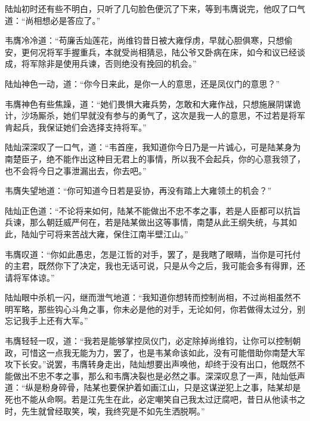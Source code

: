 陆灿初时还有些不明白，只听了几句脸色便沉了下来，等到韦膺说完，他叹了口气道：“尚相想必是答应了。”

韦膺冷冷道：“苟廉舌灿莲花，尚维钧昔日被大雍俘虏，早就心胆俱寒，只想偷安，更何况将军手握重兵，本就受尚相猜忌，陆公爷又卧病在床，如今和议已经谈成，将军除非是使用兵谏，否则绝没有挽回的机会。”

陆灿神色一动，道：“你今日来此，是你一人的意思，还是凤仪门的意思？”

韦膺神色有些焦躁，道：“她们畏惧大雍兵势，怎敢和大雍作战，只想施展阴谋诡计，沙场厮杀，她们早就没有参与的勇气了，这次是我一人的意思，不过若是将军肯起兵，我保证她们会选择支持将军。”

陆灿深深叹了一口气，道：“韦首座，我知道你今日乃是一片诚心，可是陆某身为南楚臣子，绝不能作出这种目无君上的事情，所以我不会起兵，你的心意我领了，也不会将今日之事泄漏出去，你去吧。”

韦膺失望地道：“你可知道今日若是妥协，再没有踏上大雍领土的机会？”

陆灿正色道：“不论将来如何，陆某不能做出不忠不孝之事，若是人臣都可以抗旨兵谏，那么朝廷威严何在，若是陆某做出这等事情，南楚从此王纲失统，与其如此，陆灿宁可将来苦战大雍，保住江南半壁江山。”

韦膺叹道：“你如此愚忠，怎是江哲的对手，罢了，是我瞎了眼睛，当你是可托付的主君，既然你下了决定，我也无话可说，只是从今之后，我可能会多有得罪，还请将军体谅。”

陆灿眼中杀机一闪，继而泄气地道：“我知道你想转而控制尚相，不过尚相虽然不明军略，那些钩心斗角之事，你未必是他的对手，无论如何，你若做得太过分，别忘记我手上还有大军。”

韦膺轻轻一叹，道：“我若是能够掌控凤仪门，必定除掉尚维钧，让你可以控制朝政，可惜这一点我无能为力，罢了，也是韦某命该如此，没有可能借助你南楚大军攻下长安。”说罢，韦膺转身走出，陆灿想要出声唤他，却终于没有出口，他既然不能做出不忠不孝之事，那么和韦膺决裂也是必然之事。深深叹息了一声，陆灿低声道：“纵是粉身碎骨，陆某也要保护着如画江山，只是这谋逆犯上之事，陆某却是死也不能从命啊。若是江先生在此，必定嘲笑自己我太过迂腐吧，昔日从他读书之时，先生就曾经取笑，唉，我终究是不如先生洒脱啊。”

